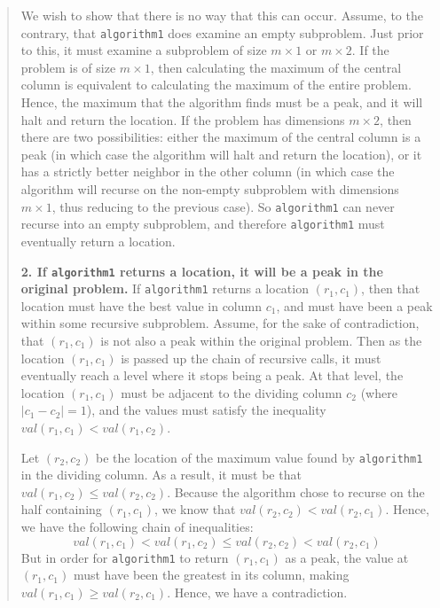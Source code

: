 \documentclass[12pt,twoside]{article}
\begin{document}
\begin{problems}
\begin{quote}
        We wish to show that there is no way that this can occur. Assume, to the
        contrary, that \texttt{algorithm1} does examine an empty subproblem. Just prior
        to this, it must examine a subproblem of size $m \times 1$ or $m \times 2$. If
        the problem is of size $m \times 1$, then calculating the maximum of the
        central column is equivalent to calculating the maximum of the entire problem.
        Hence, the maximum that the algorithm finds must be a peak, and it will halt
        and return the location. If the problem has dimensions $m \times 2$, then there
        are two possibilities: either the maximum of the central column is a peak (in
        which case the algorithm will halt and return the location), or it has a
        strictly better neighbor in the other column (in which case the algorithm will
        recurse on the non-empty subproblem with dimensions $m \times 1$, thus reducing
        to the previous case). So \texttt{algorithm1} can never recurse into an empty
        subproblem, and therefore \texttt{algorithm1} must eventually return a
        location.

            {\bf 2. If \texttt{algorithm1} returns a location,
                it will be a peak in the original problem.}
        If \texttt{algorithm1} returns a location $(r_1, c_1)$,
        then that location must have the best value in column $c_1$,
        and must have been a peak within some recursive subproblem.
        Assume, for the sake of contradiction,
        that $(r_1, c_1)$ is not also a peak within the original problem.
        Then as the location $(r_1, c_1)$ is passed up the chain of recursive calls,
        it must eventually reach a level where it stops being a peak.
        At that level, the location $(r_1, c_1)$
        must be adjacent to the dividing column $c_2$ (where $|c_1 - c_2| = 1$),
        and the values must satisfy the inequality
        $val(r_1, c_1) < val(r_1, c_2)$.

        Let $(r_2, c_2)$ be the location of the maximum value found by
        \texttt{algorithm1} in the dividing column. As a result, it must be that
        $val(r_1, c_2) \le val(r_2, c_2)$. Because the algorithm chose to recurse on
        the half containing $(r_1, c_1)$, we know that $val(r_2, c_2) < val(r_2, c_1)$.
        Hence, we have the following chain of inequalities: $$val(r_1, c_1) < val(r_1,
            c_2) \le val(r_2, c_2) < val(r_2, c_1)$$ But in order for \texttt{algorithm1}
        to return $(r_1, c_1)$ as a peak, the value at $(r_1, c_1)$ must have been the
        greatest in its column, making $val(r_1, c_1) \ge val(r_2, c_1)$. Hence, we
        have a contradiction.
    \end{quote}


\end{problems}
\end{document}
